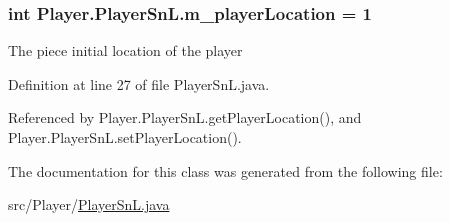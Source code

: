\hypertarget{class_player_1_1_player_sn_l_a9ff667423ca24b7b21b9775117156d68}{}
\subsubsection[{m\+\_\+player\+Location}]{\setlength{\rightskip}{0pt plus 5cm}int Player.\+Player\+Sn\+L.\+m\+\_\+player\+Location = 1}\label{class_player_1_1_player_sn_l_a9ff667423ca24b7b21b9775117156d68}
The piece initial location of the player 

Definition at line 27 of file Player\+Sn\+L.\+java.



Referenced by Player.\+Player\+Sn\+L.\+get\+Player\+Location(), and Player.\+Player\+Sn\+L.\+set\+Player\+Location().



The documentation for this class was generated from the following file\+:\begin{DoxyCompactItemize}
\item 
src/\+Player/\hyperlink{_player_sn_l_8java}{Player\+Sn\+L.\+java}\end{DoxyCompactItemize}
